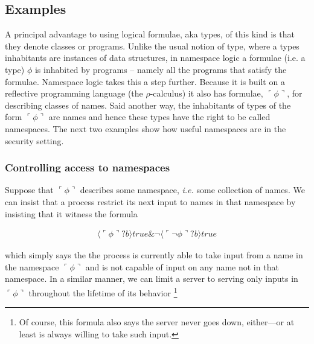 \documentclass[]{amsart}
\newcommand{\lpquote}{\ulcorner}
\newcommand{\rpquote}{\urcorner}
\newcommand{\ptrue}{\mathbin{true}}
\newcommand{\pquotep}[1]{\lpquote #1 \rpquote}
\newcommand{\pprefix}[3]{\langle #1 ? #2 \rangle #3}
\theoremstyle{definition}
\theoremstyle{remark}
\numberwithin{equation}{subsection}
\newcommand{\pic}{$\pi$-calculus}
\newcommand{\rhoc}{$\rho$-calculus}
\begin{document}

\subsection{Examples}

A principal advantage to using logical formulae, aka types, of this
kind is that they denote classes or programs. Unlike the usual notion
of type, where a types inhabitants are instances of data structures,
in namespace logic a formulae (i.e. a type) $\phi$ is inhabited by
programs -- namely all the programs that satisfy the
formulae. Namespace logic takes this a step further. Because it is
built on a reflective programming language (the \rhoc) it also has
formulae, $\pquotep{\phi}$, for describing classes of names. Said
another way, the inhabitants of types of the form $\pquotep{\phi}$ are
names and hence these types have the right to be called
namespaces. The next two examples show how useful namespaces are in
the security setting.

\subsubsection{Controlling access to namespaces}
\label{namespace}
Suppose that $\pquotep{\phi}$ describes some namespace, {\em i.e.} some
collection of names. We can insist that a process restrict its next
input to names in that namespace by insisting that it witness the formula

\begin{eqnarray}
  \pprefix{\pquotep{\phi}}{b}{\ptrue} \& \neg \pprefix{\pquotep{\neg \phi}}{b}{\ptrue} \nonumber
\end{eqnarray}

\noindent which simply says the the process is currently able to take input from
a name in the namespace $\pquotep{\phi}$ and is not capable of input on
any name not in that namespace. In a similar manner, we can limit a
server to serving only inputs in $\pquotep{\phi}$ throughout the
lifetime of its behavior \footnote{Of course, this formula also says
the server never goes down, either---or at least is always willing
to take such input.}
\end{document}
